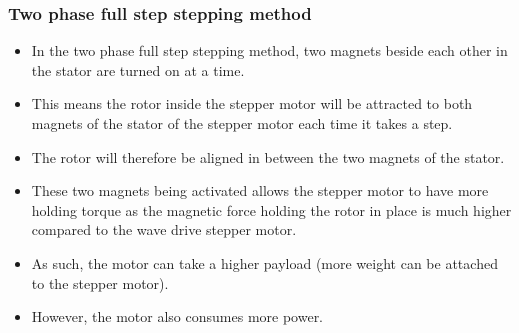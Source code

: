 \documentclass[11pt]{article}
\begin{document}
\subsubsection{Two phase full step stepping method}
\label{sec:orga43f3c8}
\begin{itemize}
\item In the two phase full step stepping method, two magnets beside each other in the stator are turned on at a time.
\item This means the rotor inside the stepper motor will be attracted to both magnets of the stator of the stepper motor each time it takes a step.
\item The rotor will therefore be aligned in between the two magnets of the stator.
\item These two magnets being activated allows the stepper motor to have more holding torque as the magnetic force holding the rotor in place is much higher compared to the wave drive stepper motor.
\item As such, the motor can take a higher payload (more weight can be attached to the stepper motor).
\item However, the motor also consumes more power.
\end{itemize}

 \newpage
\end{document}
